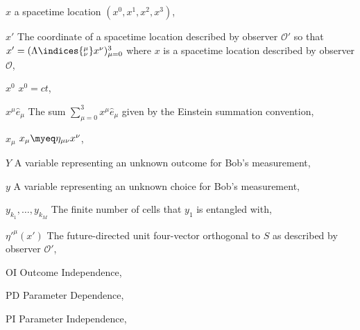\begin{thenomenclature}
  \item [{$x$}]\begingroup a spacetime location $(x^0,x^1,x^2,x^3)$, \nomrefpage{}
  \item [{$x'$}]\begingroup The coordinate of a spacetime location described by observer $\mathcal{O}'$ so that $x'=(\Lambda\indices{^\mu_\nu}x^\nu)_{\mu=0}^3$ where $x$ is a spacetime location described by observer $\mathcal{O}$, \nomrefpage{}
  \item [{$x^0$}]\begingroup $x^0=c t$, \nomrefpage{}
  \item [{$x^\mu\hat{e}_\mu$}]\begingroup The sum $\sum_{\mu=0}^3x^\mu\hat{e}_\mu$ given by the Einstein summation convention, \nomrefpage{}
  \item [{$x_\mu$}]\begingroup $x_\mu\myeq\eta_{\mu\nu}x^\nu$, \nomrefpage{}
  \item [{$Y$}]\begingroup A variable representing an unknown outcome for Bob's measurement, \nomrefpage{}
  \item [{$y$}]\begingroup A variable representing an unknown choice for Bob's measurement, \nomrefpage{}
  \item [{$y_{k_1}, \ldots, y_{k_M}$}]\begingroup The finite number of cells that $y_1$ is entangled with, \nomrefpage{}
  \item [{${\eta'}^\mu(x')$}]\begingroup The future-directed unit four-vector orthogonal to $S$ as described by observer $\mathcal{O}'$, \nomrefpage{}
  \item [{OI}]\begingroup Outcome Independence, \nomrefpage{}
  \item [{PD}]\begingroup Parameter Dependence, \nomrefpage{}
  \item [{PI}]\begingroup Parameter Independence, \nomrefpage{}

\end{thenomenclature}
